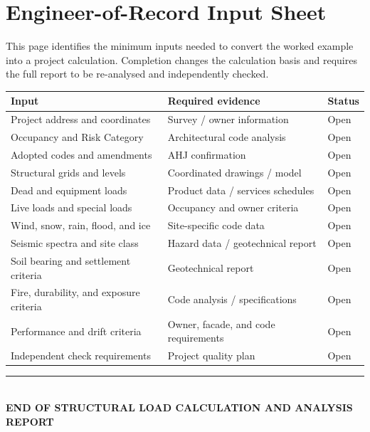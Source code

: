 \section{Engineer-of-Record Input Sheet}

This page identifies the minimum inputs needed to convert the worked example into a
project calculation. Completion changes the calculation basis and requires the full
report to be re-analysed and independently checked.

\begin{longtable}{@{}p{54mm}p{55mm}p{28mm}@{}}
  \toprule
  \textbf{Input} & \textbf{Required evidence} & \textbf{Status} \\
  \midrule
  \endhead
  Project address and coordinates & Survey / owner information & Open \\
  Occupancy and Risk Category & Architectural code analysis & Open \\
  Adopted codes and amendments & AHJ confirmation & Open \\
  Structural grids and levels & Coordinated drawings / model & Open \\
  Dead and equipment loads & Product data / services schedules & Open \\
  Live loads and special loads & Occupancy and owner criteria & Open \\
  Wind, snow, rain, flood, and ice & Site-specific code data & Open \\
  Seismic spectra and site class & Hazard data / geotechnical report & Open \\
  Soil bearing and settlement criteria & Geotechnical report & Open \\
  Fire, durability, and exposure criteria & Code analysis / specifications & Open \\
  Performance and drift criteria & Owner, facade, and code requirements & Open \\
  Independent check requirements & Project quality plan & Open \\
  \bottomrule
\end{longtable}

\vfill
\begin{center}
  \color{navy}\rule{0.72\textwidth}{0.6pt}\\[5pt]
  \textbf{END OF STRUCTURAL LOAD CALCULATION AND ANALYSIS REPORT}
\end{center}

